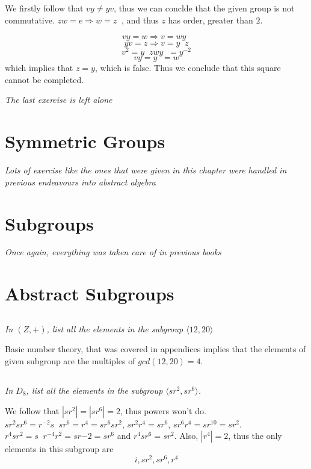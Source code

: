 \documentclass[11pt,oneside,titlepage]{book}
\DeclareMathOperator \inv {^{-1}}
\DeclareMathOperator \ra {\Rightarrow}
\newcommand{\eangle}[1]{\langle #1 \rangle}
\begin{document}
We firstly follow that $vy \neq yv$, thus we can conclde that the given group is not commutative.
$zw = e \ra w = z\inv$, and thus $z$ has order, greater than $2$.

$$vy = w \ra v = wy\inv$$
$$yv = z \ra v = y\inv z$$
$$v^2 = y\inv z w y\inv = y^{-2}$$
$$vy = y\inv = w$$
which implies that $z = y$, which is false. Thus we conclude that this square cannot be completed.

\textit{The last exercise is left alone}

\section{Symmetric Groups}

\textit{Lots of exercise like the ones that were given in this chapter were handled in previous
  endeavours into abstract algebra}

\section{Subgroups}

\textit{Once again, everything was taken care of in previous books}

\section{Abstract Subgroups}

\subsection{}

\textit{In $(Z, +)$, list all the elements in the subgroup $\eangle{12, 20}$}

Basic number theory, that was covered in appendices implies that the elements of given subgroup
are the multiples of $gcd(12, 20) = 4$.

\subsection{}

\textit{In $D_8$, list all the elements in the subgroup $\eangle{sr^2, sr^6}$.}

We follow that $|sr^2| = |sr^6| =  2$, thus powers won't do.
$sr^2sr^6 = r^{-2}s\inv sr^6 =  r^4 = sr^6sr^2$, $sr^2 r^4 = sr^6$, $sr^6 r^4 = sr^10 = sr^2$.
$r^4 sr^2 = s\inv r^{-4} r^{2} = sr{-2} = sr^6$ and $r^4 s r^6 = sr^2$. Also, $|r^4| = 2$,
thus the only elements in this subgroup are
$$i, sr^2, sr^6, r^4$$
\end{document}
